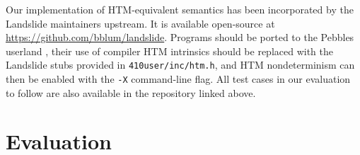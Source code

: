 \documentclass{article}
\begin{document}
Our implementation of HTM-equivalent semantics has been incorporated by the Landslide maintainers upstream.
It is available open-source at \url{https://github.com/bblum/landslide}.
Programs should be ported to the Pebbles userland \cite{thrlib,kspec},
their use of compiler HTM intrinsics should be replaced with the Landslide stubs provided in {\tt 410user/inc/htm.h},
and HTM nondeterminism can then be enabled with the {\tt -X} command-line flag.
All test cases in our evaluation to follow are also available in the repository linked above.


\section{Evaluation}

\newcommand\ETA[1]{\hilight{brownish}{{\em #1}}\xspace}
\newcommand\cpu[1]{\hilight{darkcyan}{{#1}}\xspace}
\newcommand\wtm[1]{\hilight{lime}{{#1}}\xspace}
\newcommand\ints[1]{\hilight{pinkish}{{#1}}\xspace}


\end{document}
